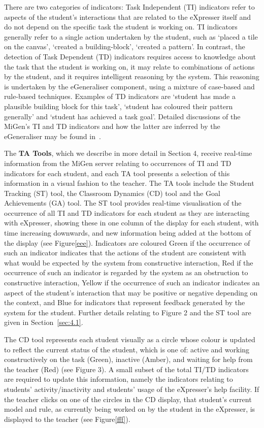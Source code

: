 There are two categories of indicators: Task Independent (TI)
indicators refer to aspects of the student’s interactions that are
related to the eXpresser itself and do not depend on the specific task
the student is working on. TI indicators generally refer to a single
action undertaken by the student, such as ‘placed a tile on the
canvas’, ‘created a building-block’, ‘created a pattern’. In contrast,
the detection of Task Dependent (TD) indicators requires access to
knowledge about the task that the student is working on, it may relate
to combinations of actions by the student, and it requires intelligent
reasoning by the system. This reasoning is undertaken by the
eGeneraliser component, using a mixture of case-based and rule-based
techniques. Examples of TD indicators are `student has made a
plausible building block for this task’, ‘student has coloured their
pattern generally’ and `student has achieved a task goal'. Detailed
discussions of the MiGen's TI and TD indicators and how the latter are
inferred by the eGeneraliser may be found in~\cite{IEEETLTPaper}.
 
The {\bf TA Tools}, which we describe in more detail in Section 4,
receive real-time information from the MiGen server relating to
occurrences of TI and TD indicators for each student, and each TA tool
presents a selection of this information in a visual fashion to the
teacher.  The TA tools include the Student Tracking (ST) tool, the
Classroom Dynamics (CD) tool and the Goal Achievements (GA) tool. The
ST tool provides real-time visualisation of the occurrence of all TI
and TD indicators for each student as they are interacting with
eXpresser, showing these in one column of the display for each
student, with time increasing downwards, and new information being
added at the bottom of the display (see Figure\ref{eee}). Indicators
are coloured Green if the occurrence of such an indicator indicates
that the actions of the student are consistent with what would be
expected by the system from constructive interaction, Red if the
occurrence of such an indicator is regarded by the system as an
obstruction to constructive interaction, Yellow if the occurrence of
such an indicator indicates an aspect of the student’s interaction
that may be positive or negative depending on the context, and Blue
for indicators that represent feedback generated by the system for the
student. Further details relating to Figure 2 and the ST tool are
given in Section~\ref{sec:4.1}.

The CD tool represents each student visually as a circle whose colour
is updated to reflect the current status of the student, which is one
of: active and working constructively on the task (Green), inactive
(Amber), and waiting for help from the teacher (Red) (see Figure 3). A
small subset of the total TI/TD indicators are required to update this
information, namely the indicators relating to students’
activity/inactivity and students’ usage of the eXpresser’s help
facility. If the teacher clicks on one of the circles in the CD
display, that student’s current model and rule, as currently being
worked on by the student in the eXpresser, is displayed to the teacher
(see Figure\ref{fff}).

